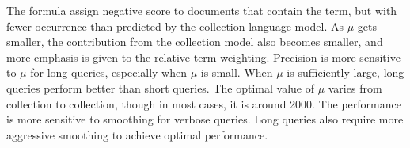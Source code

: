 The formula assign negative score to documents that contain the term, but with fewer occurrence than predicted by the collection language model. As $ \mu $ gets smaller, the contribution from the collection model also becomes smaller, and more emphasis is given to the relative term weighting. Precision is more sensitive to $ \mu $ for long queries, especially when $ \mu $ is small. When $ \mu $ is sufficiently large, long queries perform better than short queries. The optimal value of $ \mu $ varies from collection to collection, though in most cases, it is around 2000. The performance is more sensitive to smoothing for verbose queries. Long queries also require more aggressive smoothing to achieve optimal performance. 